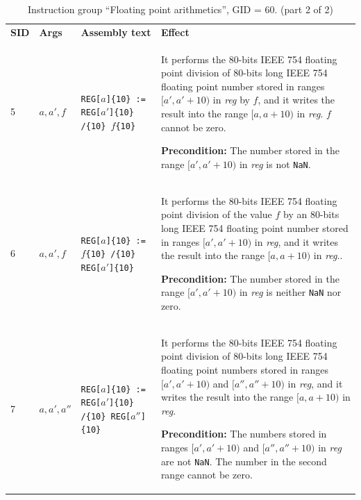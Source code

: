 \documentclass[10pt,twocolumn]{article}
\begin{document}
\begin{table}[!h]
\begin{center}
\def\arraystretch{1.5}
\begin{tabular}{lp{1.2cm}p{5.5cm}p{7.5cm}}
\textbf{SID} & \textbf{Args} & \textbf{Assembly text} & \textbf{Effect}
\\

5 & $ a,a',f $ %
& \texttt{REG[}$ a $\texttt{]\{10\} := REG[}$ a' $\texttt{]\{10\} /\{10\} }$ f
$\texttt{\{10\}} %
& It performs the $ 80 $-bits IEEE 754 floating point division of $ 80 $-bits
long IEEE 754 floating point number stored in ranges $ [a',a'+10) $ in
\textit{reg} by $ f $, and it writes the result into the range $ [a,a+10) $ in
\textit{reg}. $ f $ cannot be zero.

\textbf{Precondition:} The number stored in the range $ [a',a'+10) $ in
\textit{reg} is not \texttt{NaN}. \\

6 & $ a,a',f $ %
& \texttt{REG[}$ a $\texttt{]\{10\} := }$ f $\texttt{\{10\} /\{10\} REG[}$ a'
$\texttt{]\{10\}  } %
& It performs the $ 80 $-bits IEEE 754 floating point division of the value $ f $ by an $ 80 $-bits
long IEEE 754 floating point number stored in ranges $ [a',a'+10) $ in
\textit{reg}, and it writes the result into the range $ [a,a+10) $ in
\textit{reg}..

\textbf{Precondition:} The number stored in the range $ [a',a'+10) $ in
\textit{reg} is neither \texttt{NaN} nor zero. \\

7 & $ a,a',a'' $ %
& \texttt{REG[}$ a $\texttt{]\{10\} := REG[}$ a' $\texttt{]\{10\} /\{10\} REG[}$
a'' $\texttt{]\{10\}} %
& It performs the $ 80 $-bits IEEE 754 floating point division of $ 80 $-bits
long IEEE 754 floating point numbers stored in ranges $ [a',a'+10) $ and $
[a'',a''+10) $ in \textit{reg}, and it writes the result into the range $
[a,a+10) $ in \textit{reg}.

\textbf{Precondition:} The numbers stored in ranges $ [a',a'+10) $ and $
[a'',a''+10) $  in \textit{reg} are not \texttt{NaN}. The number in the second
range cannot be zero. \\


\end{tabular}
\end{center}
\caption{Instruction group ``Floating point arithmetics'', GID = 60. (part 2 of 2)}
\end{table}
\end{document}
